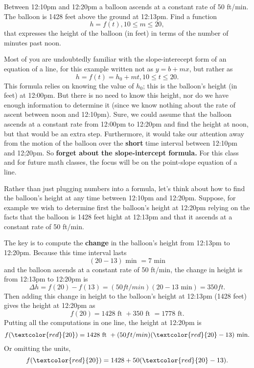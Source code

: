 \documentclass{ximera}
\begin{document}
\begin{example} \label{Ex2:LF}
Between 12:10pm and 12:20pm a balloon ascends at a constant rate of 50 ft/min. The balloon is 1428 feet above the ground at 12:13pm. Find a function 
\[
  h = f(t), 10\leq m \leq 20 ,
\]
that expresses the height of the balloon (in feet) in terms of the number of minutes past noon.


\begin{explanation}
Most of you are undoubtedly familiar with the slope-interecept form of an equation of a line, for this example written not as $y=b+mx$, but rather as 
\[
    h=f(t) =h_0 + m t , 10\leq t \leq 20.
\]
This formula relies on knowing the value of $h_0$; this is the balloon's height (in feet) at 12:00pm. But there is no need to know this height, nor do we have enough information to determine it (since we know nothing about the rate of ascent between noon and 12:10pm). Sure, we could assume that the balloon ascends at a constant rate from 12:00pm to 12:20pm and find the height at noon, but that would be an extra step. Furthermore, it would take our attention away from the motion of the balloon over the {\bf short} time interval between 12:10pm and 12;20pm. So {\bf forget about the slope-intercept formula.} For this class and for future math classes, the focus will be on the point-slope equation of a line.

Rather than just plugging numbers into a formula, let's think about how to find the balloon's height at any time between 12:10pm and 12:20pm. Suppose, for example we wish to determine first the balloon's height at 12:20pm relying on the facts that the balloon is 1428 feet hight at 12:13pm and that it ascends at a constant rate of 50 ft/min. 

The key is to compute the {\bf change} in the balloon's height from 12:13pm to 12:20pm. Because this time interval lasts 
\[
   (20 - 13) \text{ min } = 7 \text { min}
\]
and the balloon ascends at a constant rate of 50 ft/min, the change in height is from 12:13pm to 12:20pm is
\[
  \Delta h = f(20) - f(13) = (50 ft/min)(20 - 13 \text{ min})  = 350 ft .
\]
Then adding this change in height to the balloon's height at 12:13pm (1428 feet) gives the height at 12:20pm as
\[
   f(20) = 1428 \text{ ft } + 350 \text{ ft } = 1778 \text{ ft}.
\]
Putting all the computations in one line, the height at 12:20pm is
\begin{align*}
    f(\textcolor{red}{20}) &= 1428 \text{ ft } + (50 ft/min)( \textcolor{red}{20} - 13) \text{ min} . \\
\end{align*}
Or omitting the units, 
\[
     f(\textcolor{red}{20}) = 1428  + 50 ( \textcolor{red}{20} - 13 ) . 
\]


\end{explanation}
\end{example}
\end{document}

